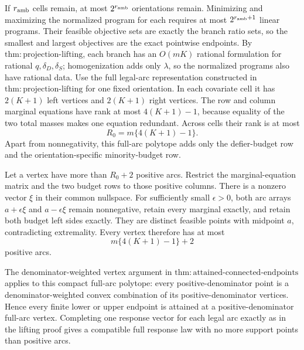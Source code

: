 If \(r_{\rm amb}\) cells remain, at most \(2^{r_{\rm amb}}\) orientations remain. Minimizing and maximizing the normalized program for each requires at most \(2^{r_{\rm amb}+1}\) linear programs. Their feasible objective sets are exactly the branch ratio sets, so the smallest and largest objectives are the exact pointwise endpoints. By \(\mathrm{thm:projection\text{-}lifting}\), each branch has an \(O(mK)\) rational formulation for rational \(q,\delta_D,\delta_S\); homogenization adds only \(\lambda\), so the normalized programs also have rational data.
Use the full legal-arc representation constructed in \(\mathrm{thm:projection\text{-}lifting}\) for one fixed orientation. In each covariate cell it has \(2(K+1)\) left vertices and \(2(K+1)\) right vertices. The row and column marginal equations have rank at most \(4(K+1)-1\), because equality of the two total masses makes one equation redundant. Across cells their rank is at most
\[
 R_0=m\{4(K+1)-1\}.
\]
Apart from nonnegativity, this full-arc polytope adds only the defier-budget row and the orientation-specific minority-budget row.

Let a vertex have more than \(R_0+2\) positive arcs. Restrict the marginal-equation matrix and the two budget rows to those positive columns. There is a nonzero vector \(\xi\) in their common nullspace. For sufficiently small \(\epsilon>0\), both arc arrays \(a+\epsilon\xi\) and \(a-\epsilon\xi\) remain nonnegative, retain every marginal exactly, and retain both budget left sides exactly. They are distinct feasible points with midpoint \(a\), contradicting extremality. Every vertex therefore has at most
\[
 m\{4(K+1)-1\}+2
\]
positive arcs.

The denominator-weighted vertex argument in \(\mathrm{thm:attained\text{-}connected\text{-}endpoints}\) applies to this compact full-arc polytope: every positive-denominator point is a denominator-weighted convex combination of its positive-denominator vertices. Hence every finite lower or upper endpoint is attained at a positive-denominator full-arc vertex. Completing one response vector for each legal arc exactly as in the lifting proof gives a compatible full response law with no more support points than positive arcs.

